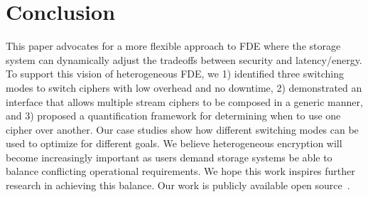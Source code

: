 \section{Conclusion}\label{sec:conclusion}

This paper advocates for a more flexible approach to FDE where the storage
system can dynamically adjust the tradeoffs between security and latency/energy.
To support this vision of heterogeneous FDE, we 1) identified three switching
modes to switch ciphers with low overhead and no downtime, 2) demonstrated an
interface that allows multiple stream ciphers to be composed in a generic
manner, and 3) proposed a quantification framework for determining when to use
one cipher over another. Our case studies show how different switching modes can
be used to optimize for different goals. We believe heterogeneous encryption
will become increasingly important as users demand storage systems be able to
balance conflicting operational requirements. We hope this work inspires further
research in achieving this balance. Our work is publicly available open
source~.


